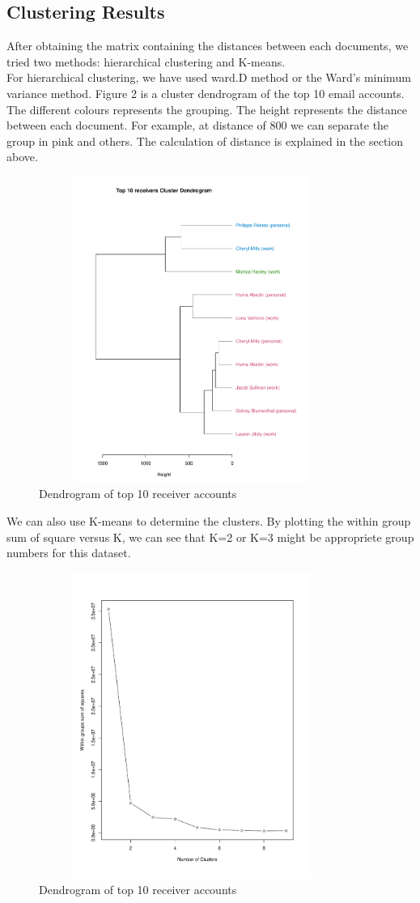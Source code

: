 \documentclass[11pt,a4paper]{article}
\begin{document}
\subsection*{Clustering Results}
After obtaining the matrix containing the distances between each documents, we tried two methods: hierarchical clustering and K-means. 
\\
For hierarchical clustering, we have used ward.D method or the Ward's minimum variance method. Figure 2 is a cluster dendrogram of the top 10 email accounts. The different colours represents the grouping. The height represents the distance between each document. For example, at distance of 800 we can separate the group in pink and others. The calculation of distance is explained in the section above.
\begin{figure}[h!]
    \centering
    \includegraphics[width=10cm,height=10cm]
    {clusterp.pdf}
    \caption{Dendrogram of top 10 receiver accounts}
\end{figure}

We can also use K-means to determine the clusters. By plotting the within group sum of square versus K, we can see that K=2 or K=3 might be appropriete group numbers for this dataset.
\begin{figure}[h!]
    \centering
    \includegraphics[width=10cm,height=10cm]
    {clusterd.pdf}
    \caption{Dendrogram of top 10 receiver accounts}
\end{figure}
\end{document}
